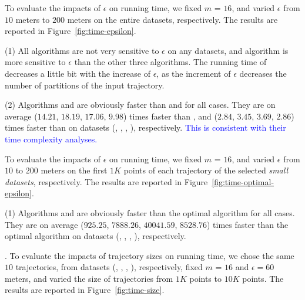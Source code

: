 {%
To evaluate the impacts of $\epsilon$ on running time, we fixed $m$ = $16$,
and varied $\epsilon$  from $10$ meters to $200$ meters on the entire
datasets, respectively.
The results are reported in Figure~\ref{fig:time-epsilon}.

\ni(1) All algorithms are not very sensitive to $\epsilon$ on any datasets, and algorithm \dps is more sensitive to $\epsilon$ than the other three algorithms.
The running time of \dps decreases a little bit with the increase of $\epsilon$, as the increment of $\epsilon$ decreases the number of partitions of the input trajectory.


\ni(2) Algorithms \cist and \cista are obviously faster than \dps and \squishe for all cases.
They are on average ($14.21$, $18.19$, $17.06$, $9.98$) times faster than \dps,
and ($2.84$, $3.45$, $3.69$, $2.86$) times faster than \squishe on
{datasets} (\sercar, \geolife, \mopsi, \pricar), respectively.
\textcolor{blue}{This is consistent with their time complexity analyses.}

To evaluate the impacts of $\epsilon$ on running time, we fixed $m$ = $16$,
and varied $\epsilon$ from $10$ to $200$ meters on the first $1K$ points of each trajectory of the selected \textit{small datasets}, respectively.
The results are reported in Figure~\ref{fig:time-optimal-epsilon}.

\ni(1) Algorithms \cist and \cista are obviously faster than the optimal algorithm for all cases.
They are on average ($925.25$, $7888.26$, $40041.59$, $8528.76$) times faster than the optimal algorithm on
datasets (\sercar, \geolife, \mopsi, \pricar), respectively.

.
To evaluate the impacts of trajectory sizes on running time,
we chose the same {$10$} trajectories, from datasets (\sercar, \geolife, \mopsi, \pricar), respectively,
fixed $m$ = $16$ and $\epsilon = 60$ meters, and varied the size  of trajectories from $1K$ points to $10K$ points.
%
The results are reported in Figure~\ref{fig:time-size}.

}
